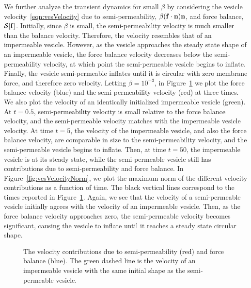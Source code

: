 \documentclass[aps,prl,showpacs]{revtex4}
\newif\ifTikz
\begin{document}
We further analyze the transient dynamics for small $\beta$ by
considering the vesicle velocity~\eqref{eqn:vesVelocity} due to
semi-permeability, $\beta(\mathbf{f} \cdot \mathbf{n})\mathbf{n}$, and force balance,
$\mathcal{S}[\mathbf{f}]$. Initially, since $\beta$ is small, the semi-permeability velocity is much
smaller than the balance velocity. Therefore,
the velocity resembles that of an impermeable vesicle. However, as the
vesicle approaches the steady state shape of an impermeable vesicle, the
force balance velocity decreases below the semi-permeability velocity,
at which point the semi-permeable vesicle begins to inflate.  Finally,
the vesicle semi-permeable inflates until it is circular with zero
membrane force, and therefore zero velocity.  Letting $\beta = 10^{-3}$,
in Figure~\ref{fig:vesVelocity} we plot the force balance velocity
(blue) and the semi-permeability velocity (red) at three times. We also
plot the velocity of an identically initialized impermeable vesicle
(green). At $t=0.5$, semi-permeability velocity is small relative to the
force balance velocity, and the semi-permeable velocity matches with the
impermeable vesicle velocity. At time $t=5$, the velocity of the
impermeable vesicle, and also the force balance velocity, are comparable
in size to the semi-permeability velocity, and the semi-permeable
vesicle begins to inflate. Then, at time $t=50$, the impermeable vesicle
is at its steady state, while the semi-permeable vesicle still has
contributions due to semi-permeability and force balance. In
Figure~\ref{fig:vesVelocityNorm}, we plot the maximum norm of the
different velocity contributions as a function of time. The black
vertical lines correspond to the times reported in
Figure~\ref{fig:vesVelocity}. Again, we see that the velocity of a
semi-permeable vesicle initially agrees with the velocity of an
impermeable vesicle. Then, as the force balance velocity approaches
zero, the semi-permeable velocity becomes significant, causing the
vesicle to inflate until it reaches a steady state circular shape.

\begin{figure}[htp]
  \centering
  \ifTikz
  
  
  
  \fi
  \caption{\label{fig:vesVelocity} The velocity contributions due to
  semi-permeability (red) and force balance (blue). The green dashed
  line is the velocity of an impermeable vesicle with the same initial
  shape as the semi-permeable vesicle.}
\end{figure}
\end{document}
